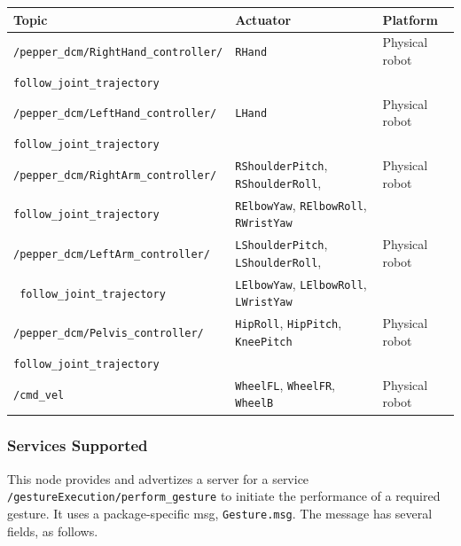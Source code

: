 \documentclass{CSSRforAfrica}
\begin{document}
{{\begin{center}
\begin{tabularx}{\linewidth}{| X | l| l|}
\hline 
{\small Topic }                                                                                & {\small Actuator }    &  {\small Platform}       \\
\hline
{\footnotesize \verb+/pepper_dcm/RightHand_controller/+ }  & {\footnotesize  \verb+RHand+} & {\small Physical robot } \\ 
{\footnotesize \verb+follow_joint_trajectory+ }                        &   & \\ 
\hline
{\footnotesize \verb+/pepper_dcm/LeftHand_controller/+ }  & {\footnotesize \verb+LHand+ } & {\small Physical robot } \\ 
{\footnotesize \verb+follow_joint_trajectory+ }  & & \\ 
\hline
{\footnotesize \verb+/pepper_dcm/RightArm_controller/+ }  & {\footnotesize \verb+RShoulderPitch+, \verb+RShoulderRoll+,   } & {\small Physical robot } \\ 
{\footnotesize \verb+follow_joint_trajectory+ }                                          & {\footnotesize \verb+RElbowYaw+, \verb+RElbowRoll+, \verb+RWristYaw+  } & \\
\hline
{\footnotesize \verb+/pepper_dcm/LeftArm_controller/+ }     & {\footnotesize  \verb+LShoulderPitch+, \verb+LShoulderRoll+,  } & {\small Physical robot } \\ 
{\footnotesize \verb+ follow_joint_trajectory+ }                                        & {\footnotesize  \verb+LElbowYaw+, \verb+LElbowRoll+, \verb+LWristYaw+  } & \\ 
\hline
{\footnotesize \verb+/pepper_dcm/Pelvis_controller/+ }  & {\footnotesize \verb+HipRoll+, \verb+HipPitch+,  \verb+KneePitch+ } & {\small Physical robot } \\ 
{\footnotesize \verb+follow_joint_trajectory+ }                                   & {\footnotesize  } & \\ 
\hline
{\footnotesize \verb+/cmd_vel+ }  & {\footnotesize \verb+WheelFL+, \verb+WheelFR+, \verb+WheelB+ } & {\small Physical robot } \\ 
\hline
\end{tabularx}
\end{center}
 

\subsubsection*{Services Supported}
 This node  provides and advertizes a server for a service {\small \verb+/gestureExecution/perform_gesture+} to initiate the performance of a required gesture. It uses a package-specific msg, {\small \verb+Gesture.msg+}.
The message has several fields, as follows.

}}
\end{document}
